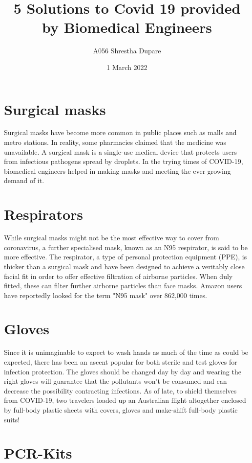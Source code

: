 \documentclass[12pt]{article}
\title{5 Solutions to Covid 19 provided by Biomedical Engineers}
\author{A056 Shrestha Dupare}
\date{1 March 2022}
\begin{document}
\maketitle

\section{Surgical masks}

Surgical masks have become more common in public places such as malls and metro stations. In reality, some pharmacies claimed that the medicine was unavailable. A surgical mask is a single-use medical device that protects users from infectious pathogens spread by droplets. In the trying times of COVID-19, biomedical engineers helped in making masks and meeting the ever growing demand of it. 


\section{Respirators}

 While surgical masks might not be the most effective way to cover from coronavirus, a further specialised mask, known as an N95 respirator, is said to be more effective. The respirator, a type of personal protection equipment (PPE), is thicker than a surgical mask and have been designed to achieve a veritably close facial fit in order to offer effective filtration of airborne particles. When duly fitted, these can filter further airborne particles than face masks. Amazon users have reportedly looked for the term "N95 mask" over 862,000 times.


\section{Gloves}

Since it is unimaginable to expect to wash hands as much of the time as could be expected, there has been an ascent popular for both sterile and test gloves for infection protection. The gloves should be changed day by day and wearing the right gloves will guarantee that the pollutants won't be consumed and can decrease the possibility contracting infections. As of late, to shield themselves from COVID-19, two travelers loaded up an Australian flight altogether enclosed by full-body plastic sheets with covers, gloves and make-shift full-body plastic suits!


\section{PCR-Kits}
\end{document}
